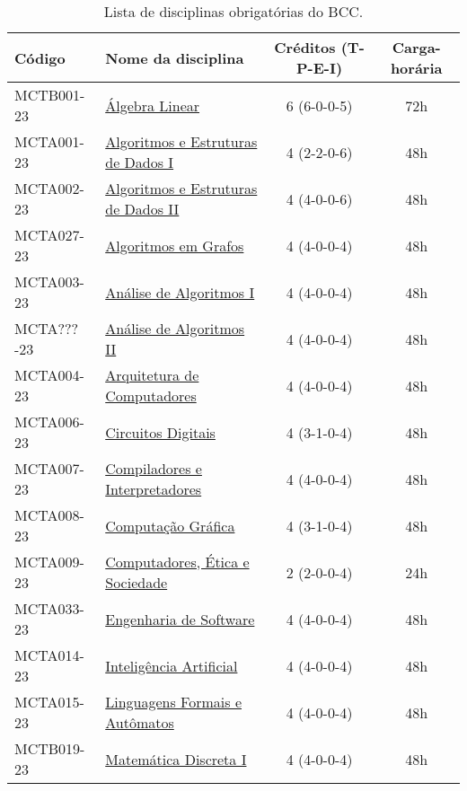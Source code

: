 \begin{table}[!h]
    \caption{Lista de disciplinas obrigatórias do BCC.}
    \label{tab:disciplinas_obrigatorias_bcc}

    \centering
    \begin{tabular}{|l|p{}|c|c|}
        \hline
        \textbf{Código} & \textbf{Nome da disciplina} & \textbf{Créditos (T-P-E-I)} & \textbf{Carga-horária}\\
        \hline\hline
        MCTB001-23 & \hyperref[disc:alge_lin]{Álgebra Linear} & 6 (6-0-0-5) & 72h \\
        \hline
        MCTA001-23 & \hyperref[disc:aedI]{Algoritmos e Estruturas de Dados I} & 4 (2-2-0-6) & 48h \\
        \hline
        MCTA002-23 & \hyperref[disc:aedII]{Algoritmos e Estruturas de Dados II} & 4 (4-0-0-6) & 48h \\
        \hline
        MCTA027-23 & \hyperref[disc:ag]{Algoritmos em Grafos} & 4 (4-0-0-4) & 48h\\
        \hline
        MCTA003-23 & \hyperref[disc:aaI]{Análise de Algoritmos I} & 4 (4-0-0-4) & 48h \\
        \hline
        MCTA???-23 & \hyperref[disc:aaII]{Análise de Algoritmos II} & 4 (4-0-0-4) & 48h \\
        \hline
        MCTA004-23 & \hyperref[disc:arq]{Arquitetura de Computadores} & 4 (4-0-0-4) & 48h \\
        \hline
        MCTA006-23 & \hyperref[disc:circ_dig]{Circuitos Digitais} & 4 (3-1-0-4) & 48h \\
        \hline
        MCTA007-23 & \hyperref[disc:compi]{Compiladores e Interpretadores} & 4 (4-0-0-4) & 48h \\
        \hline
        MCTA008-23 & \hyperref[disc:cg]{Computação Gráfica} & 4 (3-1-0-4) & 48h  \\
        \hline
        MCTA009-23 & \hyperref[disc:ces]{Computadores, Ética e Sociedade} & 2 (2-0-0-4) & 24h \\
        \hline
        MCTA033-23 & \hyperref[disc:es]{Engenharia de Software} & 4 (4-0-0-4) & 48h \\
        \hline
        MCTA014-23 & \hyperref[disc:ia]{Inteligência Artificial} & 4 (4-0-0-4) & 48h \\
        \hline
        MCTA015-23 & \hyperref[disc:lfa]{Linguagens Formais e Autômatos} & 4 (4-0-0-4) & 48h \\
        \hline
        MCTB019-23 & \hyperref[disc:mdI]{Matemática Discreta I} & 4 (4-0-0-4) & 48h \\

\end{tabular}
\end{table}
